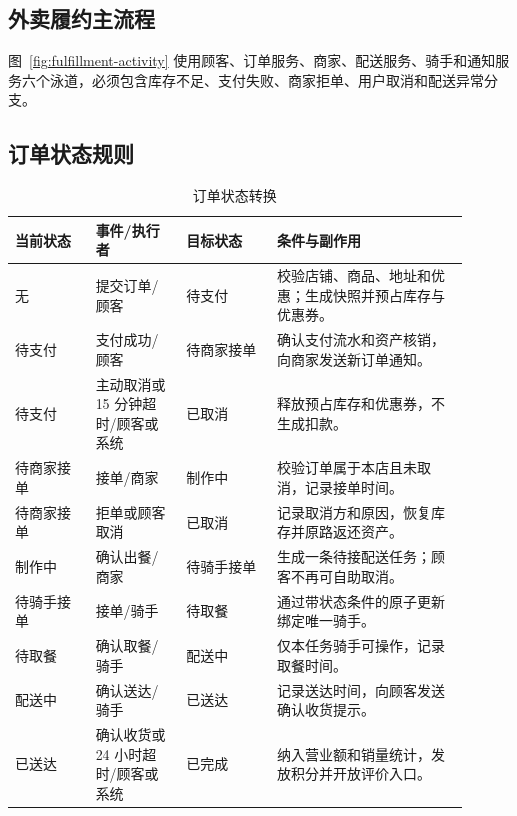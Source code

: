 \subsection{外卖履约主流程}


图~\ref{fig:fulfillment-activity} 使用顾客、订单服务、商家、配送服务、骑手和通知服务六个泳道，必须包含库存不足、支付失败、商家拒单、用户取消和配送异常分支。

\subsection{订单状态规则}


\begin{longtable}{|L{0.16\linewidth}|L{0.18\linewidth}|L{0.18\linewidth}|L{0.38\linewidth}|}
\caption{订单状态转换}\label{tab:order-state}\\ \hline
\textbf{当前状态} & \textbf{事件/执行者} & \textbf{目标状态} & \textbf{条件与副作用} \\ \hline
无 & 提交订单/顾客 & 待支付 & 校验店铺、商品、地址和优惠；生成快照并预占库存与优惠券。 \\ \hline
待支付 & 支付成功/顾客 & 待商家接单 & 确认支付流水和资产核销，向商家发送新订单通知。 \\ \hline
待支付 & 主动取消或 15 分钟超时/顾客或系统 & 已取消 & 释放预占库存和优惠券，不生成扣款。 \\ \hline
待商家接单 & 接单/商家 & 制作中 & 校验订单属于本店且未取消，记录接单时间。 \\ \hline
待商家接单 & 拒单或顾客取消 & 已取消 & 记录取消方和原因，恢复库存并原路返还资产。 \\ \hline
制作中 & 确认出餐/商家 & 待骑手接单 & 生成一条待接配送任务；顾客不再可自助取消。 \\ \hline
待骑手接单 & 接单/骑手 & 待取餐 & 通过带状态条件的原子更新绑定唯一骑手。 \\ \hline
待取餐 & 确认取餐/骑手 & 配送中 & 仅本任务骑手可操作，记录取餐时间。 \\ \hline
配送中 & 确认送达/骑手 & 已送达 & 记录送达时间，向顾客发送确认收货提示。 \\ \hline
已送达 & 确认收货或 24 小时超时/顾客或系统 & 已完成 & 纳入营业额和销量统计，发放积分并开放评价入口。 \\ \hline
\end{longtable}

